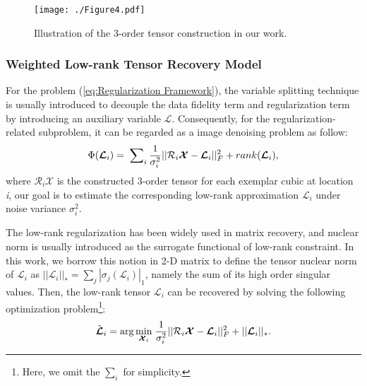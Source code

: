 \documentclass[twocolumn]{svjour3}          %
\begin{document}
\begin{figure}
    \texttt{[image: ./Figure4.pdf]}
   \caption{Illustration of the 3-order tensor construction in our work.}
\label{tensor construction}
\end{figure}

  \subsubsection{Weighted Low-rank Tensor Recovery Model}

    For the problem (\ref{eq:Regularization Framework}), the variable splitting technique \cite{lin2011linearized, goldstein2009split} is usually introduced to decouple the data fidelity term and regularization term  by introducing an auxiliary variable ${\boldsymbol{\mathcal{L}}}$. Consequently, for the regularization-related subproblem, it can be regarded as a image denoising problem as follow:
    \begin{equation}\label{eq:Concrete Format}
    \setlength{\abovedisplayskip}{2pt}
    \setlength{\belowdisplayskip}{2pt}
    \Phi ({\boldsymbol{\mathcal{L}}_i}) = {\kern 1pt} \sum\nolimits_i {\frac{1}{{\sigma _i^2}}||{{\mathcal{R}}_i}{\boldsymbol{\mathcal{X}}} - {{\boldsymbol{\mathcal{L}}_i}}||_F^2 + rank({{\boldsymbol{\mathcal{L}}_i}})},
    \end{equation}
    where ${{\mathcal{R}}_i}{\boldsymbol{\mathcal{X}}}$ is the constructed 3-order tensor for each exemplar cubic at location \emph{i}, our goal is to estimate the corresponding low-rank approximation ${\boldsymbol{\mathcal{L}}_i}$ under noise variance $\sigma _i^2$.

    The low-rank regularization has been widely used in matrix recovery, and nuclear norm is usually introduced as the surrogate functional of low-rank constraint. In this work, we borrow this notion in 2-D matrix to define the tensor nuclear norm of ${\boldsymbol{\mathcal{L}}_i}$ as $||{\boldsymbol{\mathcal{L}}_i}|{|_*} = {\sum\nolimits_j{\left| {{\sigma_j}({\boldsymbol{\mathcal{L}}_i})}\right|}_1}$, namely the sum of its high order singular values. Then, the low-rank tensor ${\boldsymbol{\mathcal{L}}_i}$ can be recovered by solving the following optimization problem\footnote{Here, we omit the $\sum\nolimits_i {}$ for simplicity.}:
    \begin{equation}\label{eq:Tensor Nuclear Norm}
    \setlength{\abovedisplayskip}{2pt}
    \setlength{\belowdisplayskip}{2pt}
    {\hat{\boldsymbol{\mathcal{L}}}_i} = \arg \mathop {\min }\limits_{{\boldsymbol{\mathcal{X}}_i}} {\kern 1pt} \frac{1}{{\sigma _i^2}}||{{\mathcal{R}}_i}{\boldsymbol{\mathcal{X}}} - {\boldsymbol{\mathcal{L}}_i}||_F^2 + ||{{\boldsymbol{\mathcal{L}}}_i}|{|_ * }.
    \end{equation}
\end{document}
